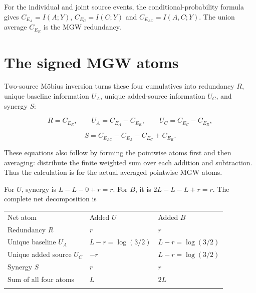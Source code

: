 For the individual and joint source events, the conditional-probability formula gives \(C_{E_A}=I(A;Y)\), \(C_{E_C}=I(C;Y)\) and \(C_{E_{AC}}=I(A,C;Y)\). The union average \(C_{E_R}\) is the MGW redundancy.

\par{}

\section{The signed MGW atoms}\label{the-signed-mgw-atoms}

Two-source Möbius inversion turns these four cumulatives into redundancy \(R\), unique baseline information \(U_A\), unique added-source information \(U_C\), and synergy \(S\):

\[
R=C_{E_R},\qquad U_A=C_{E_A}-C_{E_R},\qquad
U_C=C_{E_C}-C_{E_R},
\]

\[
S=C_{E_{AC}}-C_{E_A}-C_{E_C}+C_{E_R}.
\]

These equations also follow by forming the pointwise atoms first and then averaging: distribute the finite weighted sum over each addition and subtraction. Thus the calculation is for the actual averaged pointwise MGW atoms.

For \(U\), synergy is \(L-L-0+r=r\). For \(B\), it is \(2L-L-L+r=r\). The complete net decomposition is

{\def\LTcaptype{none} %
\begin{longtable}[]{@{}
  >{\raggedright\arraybackslash}p{}
  >{\raggedleft\arraybackslash}p{}
  >{\raggedleft\arraybackslash}p{}@{}}
\toprule\noalign{}
\begin{minipage}[b]{\linewidth}\raggedright
Net atom
\end{minipage} & \begin{minipage}[b]{\linewidth}\raggedleft
Added \(U\)
\end{minipage} & \begin{minipage}[b]{\linewidth}\raggedleft
Added \(B\)
\end{minipage} \\*
\midrule\noalign{}
\endhead
\bottomrule\noalign{}
\endfoot
Redundancy \(R\) & \(r\) & \(r\) \\*
Unique baseline \(U_A\) & \(L-r=\log(3/2)\) & \(L-r=\log(3/2)\) \\*
Unique added source \(U_C\) & \(-r\) & \(L-r=\log(3/2)\) \\*
Synergy \(S\) & \(r\) & \(r\) \\*
Sum of all four atoms & \(L\) & \(2L\) \\*
\end{longtable}
}


